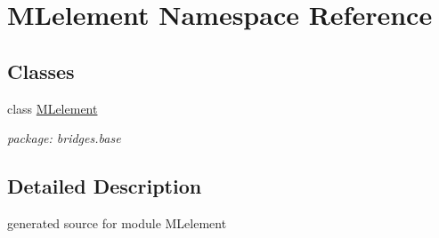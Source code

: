 \hypertarget{namespace_m_lelement}{}\section{M\+Lelement Namespace Reference}
\label{namespace_m_lelement}
\subsection*{Classes}
\begin{DoxyCompactItemize}
\item 
class \hyperlink{class_m_lelement_1_1_m_lelement}{M\+Lelement}
\begin{DoxyCompactList}\small\item\em package\+: bridges.\+base \end{DoxyCompactList}\end{DoxyCompactItemize}


\subsection{Detailed Description}
\begin{DoxyVerb}generated source for module MLelement \end{DoxyVerb}
 